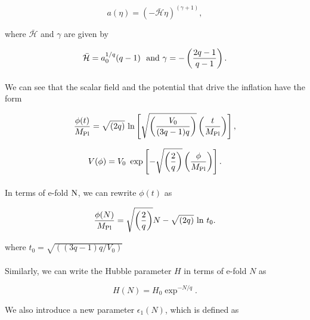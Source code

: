 \documentclass[12pt,a4paper,oneside]{book}
\begin{document}
\begin{equation}
a(\eta) = \left(-\mathcal{\bar{H}}\eta\right)^{\left(\gamma+1\right)},
\end{equation}

\noindent where $\mathcal{\bar{H}}$ and $\gamma$ are given by 

\begin{equation}
\mathcal{\bar{H}} = a_0^{1/q}(q-1) ~{\rm ~and}~ \gamma  = -\left(\frac{2q-1}{q-1}\right).
\end{equation}

\paragraph*{} We can see that the scalar field and the potential that drive the inflation have the form

\begin{equation}
\frac{\phi(t)}{M_{\rm Pl}} =\sqrt{\left(2q\right)} ~{\rm ln}\left[\sqrt{\left(\frac{V_0}{(3q-1)q}\right)}\left(\frac{t}{M_{\rm Pl}}\right)\right],
\end{equation}

\begin{equation}
V(\phi) = V_0~\exp\left[-\sqrt{\left(\frac{2}{q}\right)}\left(\frac{\phi}{M_{\rm Pl}}\right)\right].
\end{equation}

\paragraph*{} In terms of e-fold ${\rm N}$, we can rewrite $\phi(t)$ as

\begin{equation}
\frac{\phi(N)}{M_{\rm Pl}} = \sqrt{\left(\frac{2}{q}\right)} N - \sqrt{\left(2q\right)}~{\rm ln}~t_0.
\end{equation}

\noindent where $t_0 = \sqrt{\left((3q-1)q/V_0\right)}$

\paragraph*{} Similarly, we can write the Hubble parameter $H$ in terms of e-fold $N$ as 

\begin{equation}
H(N) = H_0\exp^{-N/q}.
\end{equation}

\noindent We also introduce a new parameter $\epsilon_1(N)$, which is defined as
\end{document}
